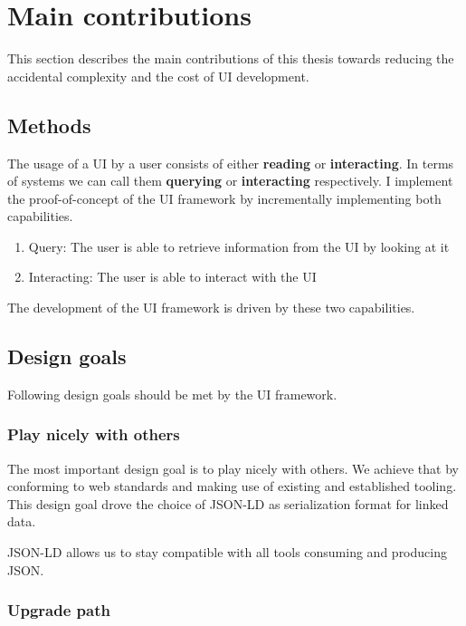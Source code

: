 \section{Main contributions}\label{contributions}

This section describes the main contributions of this thesis towards reducing the accidental complexity and the cost of UI development.

\subsection{Methods}\label{usecases}

The usage of a UI by a user consists of either \textbf{reading} or \textbf{interacting}. In terms of systems we can call them \textbf{querying} or \textbf{interacting} respectively.
I implement the proof-of-concept of the UI framework by incrementally implementing both capabilities.

\begin{enumerate}
  \item Query: The user is able to retrieve information from the UI by looking at it
  \item Interacting: The user is able to interact with the UI
\end{enumerate}

The development of the UI framework is driven by these two capabilities.

\subsection{Design goals}\label{basevocab}

Following design goals should be met by the UI framework.

\subsubsection{Play nicely with others}\label{usecases}

The most important design goal is to play nicely with others. We achieve that by conforming to web standards and making use of existing and established tooling. This design goal drove the choice of JSON-LD as serialization format for linked data.

JSON-LD allows us to stay compatible with all tools consuming and producing JSON.

\subsubsection{Upgrade path}\label{usecases}

